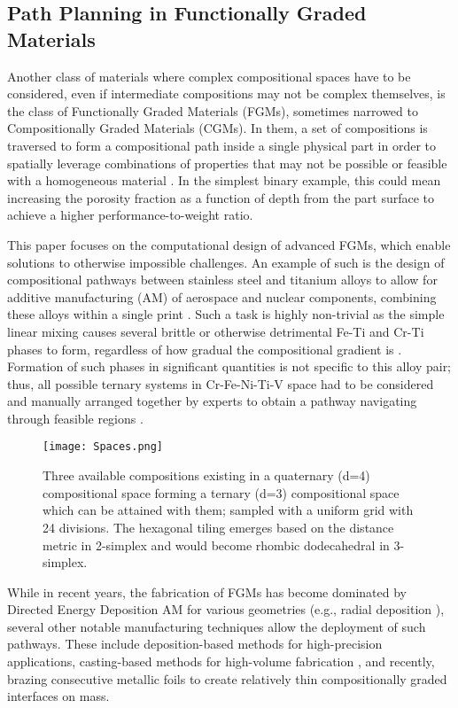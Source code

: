 \subsection{Path Planning in Functionally Graded Materials} \label{ssec:functionallygraded}

Another class of materials where complex compositional spaces have to be considered, even if intermediate compositions may not be complex themselves, is the class of Functionally Graded Materials (FGMs), sometimes narrowed to Compositionally Graded Materials (CGMs). In them, a set of compositions is traversed to form a compositional path inside a single physical part in order to spatially leverage combinations of properties that may not be possible or feasible with a homogeneous material \cite{Saleh202030Challenges}. In the simplest binary example, this could mean increasing the porosity fraction as a function of depth from the part surface to achieve a higher performance-to-weight ratio. 

This paper focuses on the computational design of advanced FGMs, which enable solutions to otherwise impossible challenges. An example of such is the design of compositional pathways between stainless steel and titanium alloys to allow for additive manufacturing (AM) of aerospace and nuclear components, combining these alloys within a single print \cite{Bobbio2022DesignCompositions}. Such a task is highly non-trivial as the simple linear mixing causes several brittle or otherwise detrimental Fe-Ti and Cr-Ti phases to form, regardless of how gradual the compositional gradient is \cite{Reichardt2016DevelopmentManufacturing}. Formation of such phases in significant quantities is not specific to this alloy pair; thus, all possible ternary systems in Cr-Fe-Ni-Ti-V space had to be considered and manually arranged together by experts to obtain a pathway navigating through feasible regions \cite{Bobbio2022DesignCompositions}.


\begin{figure}[H]
    \centering
    \texttt{[image: Spaces.png]}
    \caption{Three available compositions existing in a quaternary (d=4) compositional space forming a ternary (d=3) compositional space which can be attained with them; sampled with a uniform grid with 24 divisions. The hexagonal tiling emerges based on the distance metric in 2-simplex and would become rhombic dodecahedral in 3-simplex.} 
    \label{fig:fgmspaces}
\end{figure}

While in recent years, the fabrication of FGMs has become dominated by Directed Energy Deposition AM for various geometries (e.g., radial deposition \cite{Hofmann2014DevelopingManufacturing}), several other notable manufacturing techniques allow the deployment of such pathways. These include deposition-based methods for high-precision applications, casting-based methods for high-volume fabrication \cite{Saleh202030Challenges}, and recently, brazing consecutive metallic foils \cite{Wu2023ATechnology} to create relatively thin compositionally graded interfaces on mass.

